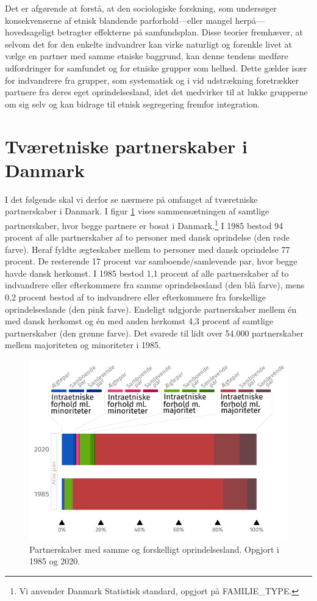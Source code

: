 \documentclass[
]{book}
\begin{document}
Det er afgørende at forstå, at den sociologiske forskning, som undersøger konsekvenserne af etnisk blandende parforhold---eller mangel herpå---hovedsageligt betragter effekterne på samfundsplan. Disse teorier fremhæver, at selvom det for den enkelte indvandrer kan virke naturligt og forenkle livet at vælge en partner med samme etniske baggrund, kan denne tendens medføre udfordringer for samfundet og for etniske grupper som helhed. Dette gælder især for indvandrere fra grupper, som systematisk og i vid udstrækning foretrækker partnere fra deres eget oprindelsesland, idet det medvirker til at lukke grupperne om sig selv og kan bidrage til etnisk segregering fremfor integration.

\section{Tværetniske partnerskaber i Danmark}\label{tvuxe6retniske-partnerskaber-i-danmark}

I det følgende skal vi derfor se nærmere på omfanget af tværetniske partnerskaber i Danmark. I figur \ref{fig:fig-2-1} vises sammensætningen af samtlige partnerskaber, hvor begge partnere er bosat i Danmark.\footnote{Vi anvender Danmark Statistisk standard, opgjort på FAMILIE\_TYPE.} I 1985 bestod 94 procent af alle partnerskaber af to personer med dansk oprindelse (den røde farve). Heraf fyldte ægteskaber mellem to personer med dansk oprindelse 77 procent. De resterende 17 procent var samboende/samlevende par, hvor begge havde dansk herkomst. I 1985 bestod 1,1 procent af alle partnerskaber af to indvandrere eller efterkommere fra samme oprindelsesland (den blå farve), mens 0,2 procent bestod af to indvandrere eller efterkommere fra forskellige oprindelseslande (den pink farve). Endeligt udgjorde partnerskaber mellem én med dansk herkomst og én med anden herkomst 4,3 procent af samtlige partnerskaber (den grønne farve). Det svarede til lidt over 54.000 partnerskaber mellem majoriteten og minoriteter i 1985.

\begin{figure}

{\centering \includegraphics[width=0.75\linewidth]{images/figur_intergruppepartnerskaber_alle} 

}

\caption{ Partnerskaber med samme og forskelligt oprindelsesland. Opgjort i 1985 og 2020.}\label{fig:fig-2-1}
\end{figure}
\end{document}
